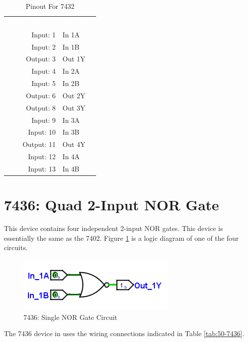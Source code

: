 \begin{table}[H]
	\sffamily
	\newcommand{\head}[1]{\textcolor{white}{\textbf{#1}}}		
	\begin{center}
		\begin{tabular}{rl} 
			\rowcolor{black!75}
			\head{Logisim Label} & \head{Function} \\
			Input: 1   & In 1A  \\
			Input: 2   & In 1B  \\
			Output: 3  & Out 1Y \\
			Input: 4   & In 2A  \\
			Input: 5   & In 2B  \\
			Output: 6  & Out 2Y \\
			Output: 8  & Out 3Y \\
			Input: 9   & In 3A  \\
			Input: 10  & In 3B  \\
			Output: 11 & Out 4Y \\
			Input: 12  & In 4A  \\
			Input: 13  & In 4B  \\
		\end{tabular}
	\end{center}
	\caption{Pinout For 7432}
	\label{tab:50-7432}
\end{table}

\section{7436: Quad 2-Input NOR Gate}

This device contains four independent 2-input NOR gates. This device is essentially the same as the 7402. Figure \ref{fig:50-7436} is a logic diagram of one of the four circuits.

\begin{figure}[H]
	\centering
	\includegraphics{gfx/50-7402}
	\caption{7436: Single NOR Gate Circuit}
	\label{fig:50-7436}
\end{figure}

The 7436 device in \LE uses the wiring connections indicated in Table \ref{tab:50-7436}.

